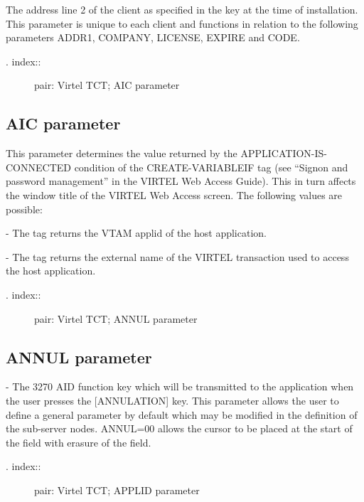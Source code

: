 \documentclass[letterpaper,10pt,english]{sphinxmanual}
\begin{document}
The address line 2 of the client as specified in the key at the time of installation. This parameter is unique to each client and functions in relation to the following parameters ADDR1, COMPANY, LICENSE, EXPIRE and CODE.
\begin{description}
\item[{. index::}] \leavevmode
pair: Virtel TCT; AIC parameter

\end{description}


\subsection{AIC parameter}
\label{\detokenize{Installation_Guide:aic-parameter}}
\begin{sphinxVerbatim}[commandchars=\\\{\}]
 
\end{sphinxVerbatim}

This parameter determines the value returned by the APPLICATION-IS-CONNECTED condition of the CREATE-VARIABLEIF tag (see “Signon and password management” in the VIRTEL Web Access Guide). This in turn affects the window title of the VIRTEL Web Access screen. The following values are possible:

 - The tag returns the VTAM applid of the host application.

 - The tag returns the external name of the VIRTEL transaction used to access the host application.
\begin{description}
\item[{. index::}] \leavevmode
pair: Virtel TCT; ANNUL parameter

\end{description}


\subsection{ANNUL parameter}
\label{\detokenize{Installation_Guide:annul-parameter}}
\begin{sphinxVerbatim}[commandchars=\\\{\}]
  
\end{sphinxVerbatim}

 - The 3270 AID function key which will be transmitted to the application when the user presses the {[}ANNULATION{]} key. This parameter allows the user to define a general parameter by default which may be modified in the definition of the sub-server nodes.
ANNUL=00 allows the cursor to be placed at the start of the field with erasure of the field.
\begin{description}
\item[{. index::}] \leavevmode
pair: Virtel TCT; APPLID parameter

\end{description}
\end{document}
